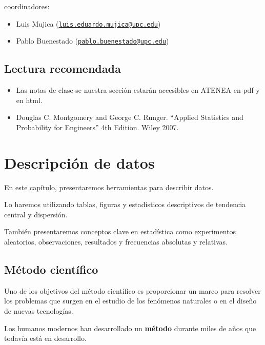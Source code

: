\documentclass[
]{book}
\providecommand{\tightlist}{%
  \setlength{\itemsep}{0pt}\setlength{\parskip}{0pt}}
\begin{document}
coordinadores:

\begin{itemize}
\tightlist
\item
  Luis Mujica (\href{mailto:luis.eduardo.mujica@upc.edu}{\nolinkurl{luis.eduardo.mujica@upc.edu}})
\item
  Pablo Buenestado (\href{mailto:pablo.buenestado@upc.edu}{\nolinkurl{pablo.buenestado@upc.edu}})
\end{itemize}

\hypertarget{lectura-recomendada}{%
\section{Lectura recomendada}\label{lectura-recomendada}}

\begin{itemize}
\item
  Las notas de clase se nuestra sección estarán accesibles en ATENEA en pdf y en html.
\item
  Douglas C. Montgomery and George C. Runger. ``Applied Statistics and Probability for Engineers'' 4th Edition. Wiley 2007.
\end{itemize}

\hypertarget{descripciuxf3n-de-datos}{%
\chapter{Descripción de datos}\label{descripciuxf3n-de-datos}}

En este capítulo, presentaremos herramientas para describir datos.

Lo haremos utilizando tablas, figuras y estadísticos descriptivos de tendencia central y dispersión.

También presentaremos conceptos clave en estadística como experimentos aleatorios, observaciones, resultados y frecuencias absolutas y relativas.

\hypertarget{muxe9todo-cientuxedfico}{%
\section{Método científico}\label{muxe9todo-cientuxedfico}}

Uno de los objetivos del método científico es proporcionar un marco para resolver los problemas que surgen en el estudio de los fenómenos naturales o en el diseño de nuevas tecnologías.

Los humanos modernos han desarrollado un \textbf{método} durante miles de años que todavía está en desarrollo.
\end{document}
